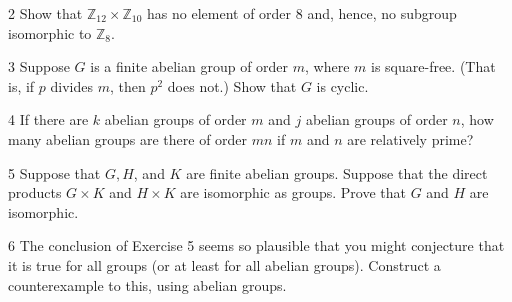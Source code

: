 \begin{problem}{2}
    Show that $\mathbb{Z}_{12} \times \mathbb{Z}_{10}$ has no element of order 8 and,
    hence, no subgroup isomorphic to $\mathbb{Z}_8$.
\end{problem}
\unsolved

\begin{problem}{3}
    Suppose $G$ is a finite abelian group of order $m$, where $m$ is square-free. (That is,
    if $p$ divides $m$, then $p^2$ does not.) Show that $G$ is cyclic.
\end{problem}
\unsolved

\begin{problem}{4}
    If there are $k$ abelian groups of order $m$ and $j$ abelian groups of order $n$, how
    many abelian groups are there of order $mn$ if $m$ and $n$ are relatively prime?
\end{problem}
\unsolved

\begin{problem}{5}
    Suppose that $G, H$, and $K$ are finite abelian groups. Suppose that the direct
    products $G \times K$ and $H \times K$ are isomorphic as groups. Prove that $G$ and $H$
    are isomorphic.
\end{problem}
\unsolved

\begin{problem}{6}
    The conclusion of Exercise 5 seems so plausible that you might conjecture that it is
    true for all groups (or at least for all abelian groups). Construct a counterexample to
    this, using abelian groups.
\end{problem}
\unsolved
